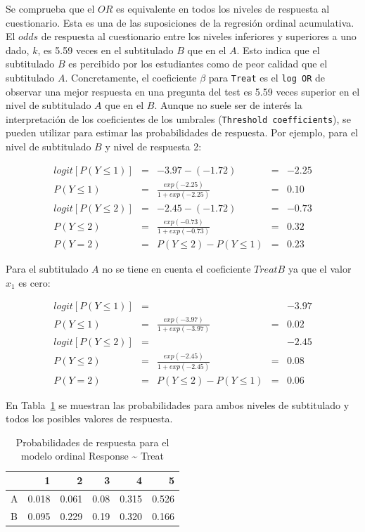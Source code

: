 \documentclass[
  12pt,
  a4paper,
  extrafontsizes,
  onecolumn,
  openright,
  table]{memoir}
\begin{document}
Se comprueba que el \(OR\) es equivalente en todos los niveles de
respuesta al cuestionario. Esta es una de las suposiciones de la
regresión ordinal acumulativa. El \(odds\) de respuesta al cuestionario
entre los niveles inferiores y superiores a uno dado, \(k\), es 5.59
veces en el subtitulado \(B\) que en el \(A\). Esto indica que el
subtitulado \(B\) es percibido por los estudiantes como de peor calidad
que el subtitulado \(A\). Concretamente, el coeficiente \(\beta\) para
\texttt{Treat} es el \texttt{log\ OR} de observar una mejor respuesta en
una pregunta del test es 5.59 veces superior en el nivel de subtitulado
\(A\) que en el \(B\). Aunque no suele ser de interés la interpretación
de los coeficientes de los umbrales (\texttt{Threshold\ coefficients}),
se pueden utilizar para estimar las probabilidades de respuesta. Por
ejemplo, para el nivel de subtitulado \(B\) y nivel de respuesta 2:

\[
\begin{aligned}
logit [P(Y \le 1)] & = & -3.97 - (-1.72) & = & -2.25 \\
P(Y \le 1) & = & \frac{exp(-2.25)}{1 + exp(-2.25)} & = & 0.10 \\
logit [P(Y \le 2)] & = & -2.45 - (-1.72) & = & -0.73 \\
P(Y \le 2) & = & \frac{exp(-0.73)}{1 + exp(-0.73)} & = & 0.32 \\
P(Y = 2) & = & P(Y \le 2) - P(Y \le 1) & = &  0.23 
\end{aligned}
\]

Para el subtitulado \(A\) no se tiene en cuenta el coeficiente
\(TreatB\) ya que el valor \(x_1\) es cero:

\[
\begin{aligned}
logit [P(Y \le 1)] & = & & & -3.97 \\
P(Y \le 1) & = & \frac{exp(-3.97)}{1 + exp(-3.97)} & = & 0.02 \\
logit [P(Y \le 2)] & = & & & -2.45 \\
P(Y \le 2) & = & \frac{exp(-2.45)}{1 + exp(-2.45)} & = & 0.08 \\
P(Y = 2) & = & P(Y \le 2) - P(Y \le 1) & = &  0.06 
\end{aligned}
\]

En Tabla~\ref{tbl-probs-clm-treat} se muestran las probabilidades para
ambos niveles de subtitulado y todos los posibles valores de respuesta.

\hypertarget{tbl-probs-clm-treat}{}
\begin{table}
\caption{\label{tbl-probs-clm-treat}Probabilidades de respuesta para el modelo ordinal Response
\textasciitilde{} Treat }\tabularnewline

\centering
\begin{tabular}{l|r|r|r|r|r}
\hline
  & 1 & 2 & 3 & 4 & 5\\
\hline
A & 0.018 & 0.061 & 0.08 & 0.315 & 0.526\\
\hline
B & 0.095 & 0.229 & 0.19 & 0.320 & 0.166\\
\hline
\end{tabular}
\end{table}
\end{document}
